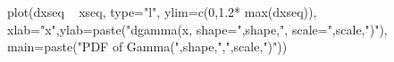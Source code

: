 \begin{Schunk}
\begin{Sinput}
  plot(dxseq ~ xseq, type="l", ylim=c(0,1.2* max(dxseq)), xlab="x",ylab=paste("dgamma(x, shape=",shape,", scale=",scale,")"), main=paste("PDF of Gamma(",shape,",",scale,")"))
\end{Sinput}
\end{Schunk}

